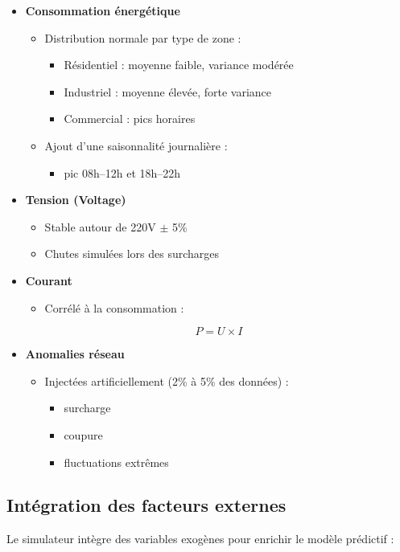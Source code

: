 \documentclass[1pt,a4paper]{report}
\begin{document}
\begin{itemize}
\item \textbf{Consommation énergétique}
\begin{itemize}
\item Distribution normale par type de zone :
\begin{itemize}
\item Résidentiel : moyenne faible, variance modérée
\item Industriel : moyenne élevée, forte variance
\item Commercial : pics horaires
\end{itemize}
\item Ajout d’une saisonnalité journalière :
\begin{itemize}
\item pic 08h–12h et 18h–22h
\end{itemize}
\end{itemize}

\item \textbf{Tension (Voltage)}
\begin{itemize}
\item Stable autour de 220V $\pm$ 5\%
\item Chutes simulées lors des surcharges
\end{itemize}

\item \textbf{Courant}
\begin{itemize}
\item Corrélé à la consommation :
\end{itemize}

\[
P = U \times I
\]

\item \textbf{Anomalies réseau}
\begin{itemize}
\item Injectées artificiellement (2\% à 5\% des données) :
\begin{itemize}
\item surcharge
\item coupure
\item fluctuations extrêmes
\end{itemize}
\end{itemize}
\end{itemize}

\subsection{Intégration des facteurs externes}
Le simulateur intègre des variables exogènes pour enrichir le modèle prédictif :
\end{document}
